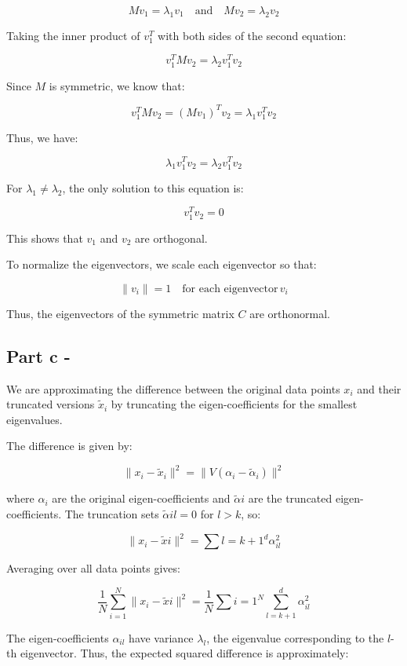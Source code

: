 \documentclass{article}
\begin{document}
\[
M v_1 = \lambda_1 v_1 \quad \text{and} \quad M v_2 = \lambda_2 v_2
\]

Taking the inner product of $v_1^T$ with both sides of the second equation:

\[
v_1^T M v_2 = \lambda_2 v_1^T v_2
\]

Since $M$ is symmetric, we know that:

\[
v_1^T M v_2 = (M v_1)^T v_2 = \lambda_1 v_1^T v_2
\]

Thus, we have:

\[
\lambda_1 v_1^T v_2 = \lambda_2 v_1^T v_2
\]

For $\lambda_1 \neq \lambda_2$, the only solution to this equation is:

\[
v_1^T v_2 = 0
\]

This shows that $v_1$ and $v_2$ are orthogonal.

To normalize the eigenvectors, we scale each eigenvector so that:

\[
\|v_i\| = 1 \quad \text{for each eigenvector} \, v_i
\]

Thus, the eigenvectors of the symmetric matrix $C$ are orthonormal.


\subsection*{Part c - }

We are approximating the difference between the original data points \( x_i \) and their truncated versions \( \tilde{x}_i \) by truncating the eigen-coefficients for the smallest eigenvalues.

The difference is given by:

\[
\| x_i - \tilde{x}_i \|^2 = \| V (\alpha_i - \tilde{\alpha}_i) \|^2
\]

where \( \alpha_i \) are the original eigen-coefficients and \( \tilde{\alpha}i \) are the truncated eigen-coefficients. The truncation sets \( \tilde{\alpha}{il} = 0 \) for \( l > k \), so:

\[
\| x_i - \tilde{x}i \|^2 = \sum{l=k+1}^d \alpha_{il}^2
\]

Averaging over all data points gives:

\[
\frac{1}{N} \sum_{i=1}^N \| x_i - \tilde{x}i \|^2 = \frac{1}{N} \sum{i=1}^N \sum_{l=k+1}^d \alpha_{il}^2
\]

The eigen-coefficients \( \alpha_{il} \) have variance \( \lambda_l \), the eigenvalue corresponding to the \( l \)-th eigenvector. Thus, the expected squared difference is approximately:
\end{document}
